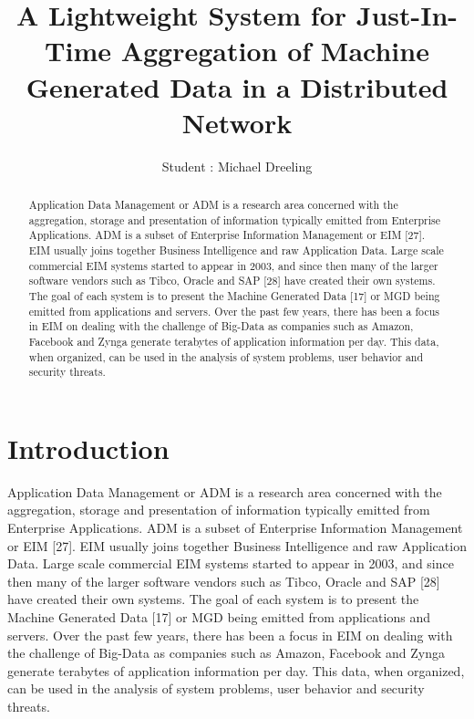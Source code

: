 \documentclass{llncs}
\begin{document}
%
\newpage
\tableofcontents
\newpage
%
\title{A Lightweight System for Just-In-Time Aggregation of Machine Generated Data in a Distributed Network}

\author{Student : Michael Dreeling}


\maketitle
%
\begin{abstract}
Application Data Management or ADM is a research area concerned with the aggregation, storage and presentation of information typically emitted from Enterprise Applications. ADM is a subset of Enterprise Information Management or EIM [27]. EIM usually joins together Business Intelligence and raw Application Data. Large scale commercial EIM systems started to appear in 2003, and since then many of the larger software vendors such as Tibco, Oracle and SAP [28] have created their own systems. The goal of each system is to present the Machine Generated Data [17] or MGD being emitted from applications and servers. Over the past few years, there has been a focus in EIM on dealing with the challenge of Big-Data as companies such as Amazon, Facebook and Zynga generate terabytes of application information per day. This data, when organized, can be used in the analysis of system problems, user behavior and security threats.
\end{abstract}
%
\section{Introduction}
%
Application Data Management or ADM is a research area concerned with the aggregation, storage and presentation of information typically emitted from Enterprise Applications. ADM is a subset of Enterprise Information Management or EIM [27]. EIM usually joins together Business Intelligence and raw Application Data. Large scale commercial EIM systems started to appear in 2003, and since then many of the larger software vendors such as Tibco, Oracle and SAP [28] have created their own systems. The goal of each system is to present the Machine Generated Data [17] or MGD being emitted from applications and servers. Over the past few years, there has been a focus in EIM on dealing with the challenge of Big-Data as companies such as Amazon, Facebook and Zynga generate terabytes of application information per day. This data, when organized, can be used in the analysis of system problems, user behavior and security threats.
\end{document}

